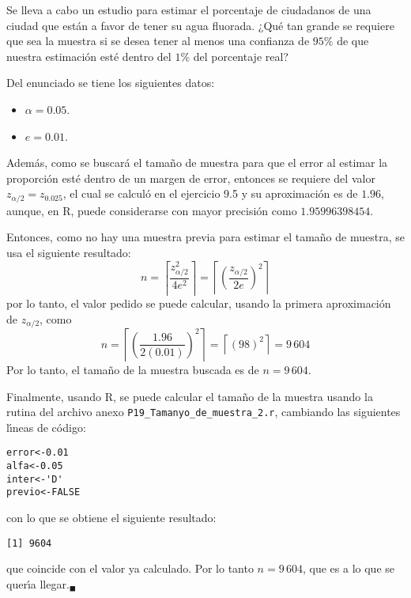 \begin{enunciado}
 Se lleva a cabo un estudio para estimar el porcentaje de ciudadanos de una ciudad que est\'an a favor de tener su agua fluorada. ¿Qu\'e tan grande se requiere que sea la muestra si se desea tener al menos una confianza de $95\%$ de que nuestra estimaci\'on est\'e dentro del $1\%$ del porcentaje real?
\end{enunciado}

\begin{solucion}
 Del enunciado se tiene los siguientes datos:
 \begin{itemize}
  \item $\alpha = 0.05$.
  \item $e = 0.01$.
 \end{itemize}
 Adem\'as, como se buscar\'a el tama\~no de muestra para que el error al estimar la proporci\'on est\'e dentro de un margen de error, entonces se requiere del valor $z_{\alpha/2} = z_{0.025}$, el cual se calcul\'o en el ejercicio 9.5 y su aproximaci\'on es de $1.96$, aunque, en R, puede considerarse con mayor precisi\'on como $1.95996398454$.
 \par 
 Entonces, como no hay una muestra previa para estimar el tama\~no de muestra, se usa el siguiente resultado:
 \begin{equation*}
  n = \left\lceil \frac{z_{\alpha/2}^2}{4e^2} \right\rceil = \left\lceil \left( \frac{z_{\alpha/2}}{2e} \right)^2 \right\rceil
 \end{equation*}
 por lo tanto, el valor pedido se puede calcular, usando la primera aproximaci\'on de $z_{\alpha/2}$, como
 \begin{equation*}
  n = \left\lceil \left( \frac{1.96}{2(0.01)} \right)^2 \right\rceil = \left\lceil \left( 98 \right)^2 \right\rceil = 9\,604
 \end{equation*}
 Por lo tanto, el tama\~no de la muestra buscada es de $n=9\,604$.
 \par 
 Finalmente, usando R, se puede calcular el tama\~no de la muestra usando la rutina del archivo anexo \texttt{P19\_Tamanyo\_de\_muestra\_2.r}, cambiando las siguientes l\'{\i}neas de c\'odigo:
 \begin{verbatim}
error<-0.01
alfa<-0.05
inter<-'D'
previo<-FALSE
 \end{verbatim}
 \vspace{-0.5cm}
 con lo que se obtiene el siguiente resultado:
 \begin{verbatim}
[1] 9604
 \end{verbatim}
 \vspace{-0.5cm}
 que coincide con el valor ya calculado. Por lo tanto $n=9\,604$, que es a lo que se quer\'{\i}a llegar.${}_{\blacksquare}$
\end{solucion}
